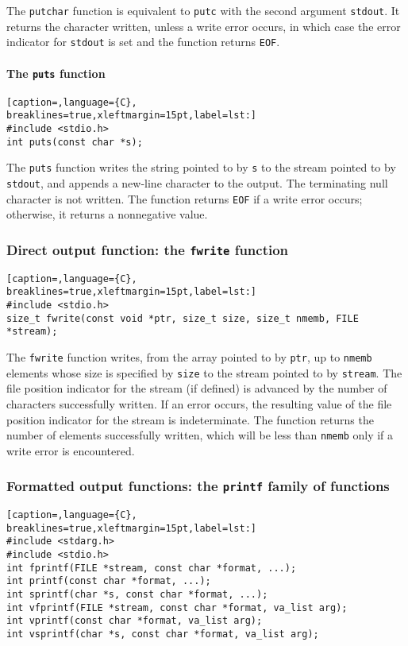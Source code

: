 The \texttt{putchar} function is equivalent to \texttt{putc} with the second
argument \texttt{stdout}. It returns the character written, unless a write
error occurs, in which case the error indicator for \texttt{stdout} is set and
the function returns \texttt{EOF}.

\paragraph{The \texttt{puts} function}
\lstset{basicstyle=\scriptsize, numbers=left, captionpos=b, tabsize=4}
\begin{lstlisting}[caption=,language={C},
breaklines=true,xleftmargin=15pt,label=lst:]
#include <stdio.h>
int puts(const char *s);
\end{lstlisting}

The \texttt{puts} function writes the string pointed to by \texttt{s} to the
stream pointed to by \texttt{stdout}, and appends a new-line character to the
output. The terminating null character is not written. The function returns
\texttt{EOF} if a write error occurs; otherwise, it returns a nonnegative
value.

\subsubsection{Direct output function: the \texttt{fwrite} function}
\lstset{basicstyle=\scriptsize, numbers=left, captionpos=b, tabsize=4}
\begin{lstlisting}[caption=,language={C},
breaklines=true,xleftmargin=15pt,label=lst:]
#include <stdio.h>
size_t fwrite(const void *ptr, size_t size, size_t nmemb, FILE *stream);
\end{lstlisting}

The \texttt{fwrite} function writes, from the array pointed to by \texttt{ptr},
up to \texttt{nmemb} elements whose size is specified by \texttt{size} to the
stream pointed to by \texttt{stream}. The file position indicator for the
stream (if defined) is advanced by the number of characters successfully
written. If an error occurs, the resulting value of the file position indicator
for the stream is indeterminate. The function returns the number of elements
successfully written, which will be less than \texttt{nmemb} only if a write
error is encountered.

\subsubsection{Formatted output functions: the \texttt{printf} family of functions}
\lstset{basicstyle=\scriptsize, numbers=left, captionpos=b, tabsize=4}
\begin{lstlisting}[caption=,language={C},
breaklines=true,xleftmargin=15pt,label=lst:]
#include <stdarg.h>
#include <stdio.h>
int fprintf(FILE *stream, const char *format, ...);
int printf(const char *format, ...);
int sprintf(char *s, const char *format, ...);
int vfprintf(FILE *stream, const char *format, va_list arg);
int vprintf(const char *format, va_list arg);
int vsprintf(char *s, const char *format, va_list arg);
\end{lstlisting}

